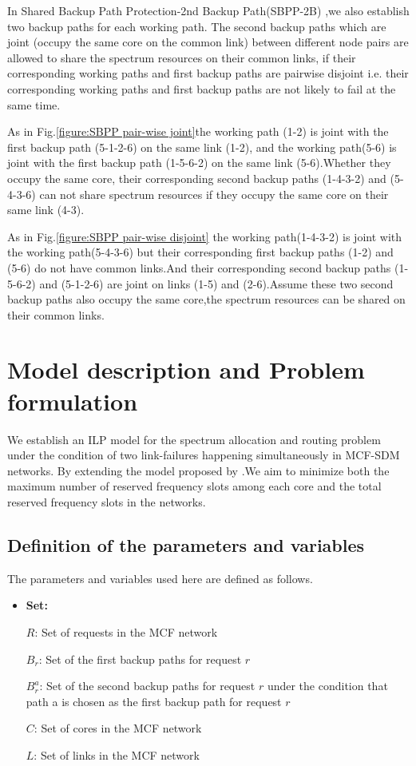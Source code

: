 \documentclass[a4paper,11pt]{report}
\begin{document}
    In Shared Backup Path Protection-2nd Backup Path(SBPP-2B) ,we also establish two backup paths for each working path. The second backup paths which are joint (occupy the same core on the common link) between different node pairs are allowed to share the spectrum resources on their common links, if their corresponding working paths and first backup paths are pairwise disjoint i.e. their corresponding working paths and first backup paths are not likely to fail at the same time.\par
    As in Fig.\ref{figure:SBPP pair-wise joint}the working path (1-2) is joint with the first backup path (5-1-2-6) on the same link (1-2), and the working path(5-6) is joint with the first backup path (1-5-6-2) on the same link (5-6).Whether they occupy the same core, their corresponding second backup paths (1-4-3-2) and (5-4-3-6) can not share spectrum resources if they occupy the same core on their same link (4-3).\par
    As in Fig.\ref{figure:SBPP pair-wise disjoint} the working path(1-4-3-2) is joint with the working path(5-4-3-6) but their corresponding first backup paths (1-2) and (5-6) do not have common links.And their corresponding second backup paths (1-5-6-2) and (5-1-2-6) are joint on links (1-5) and (2-6).Assume these two second backup paths also occupy the same core,the spectrum resources can be shared on their common links.\par

\section{Model description and Problem formulation}        
        
We establish an ILP model for the spectrum allocation and routing problem under the condition of two link-failures happening simultaneously in MCF-SDM networks. By extending the model proposed by  \cite{Hong Guo2016}.We aim to minimize both the maximum number of reserved frequency slots among each core and the total reserved frequency slots in the networks.\par

\subsection{Definition of the parameters and variables}
The  parameters and variables used here are defined as follows.
\begin{itemize}
    \item\textbf{Set:}
        \item[$R$:]Set of requests in the MCF network
        \item[$B^{}_r$:]Set of the first backup paths for request $r$
        \item[$B^{a}_r$:]Set of the second backup paths for request $r$ under the condition that path a is chosen as the first backup path for request $r$
        \item[$C$:]Set of cores in the MCF network
        \item[$L$:]Set of links in the MCF network
\end{itemize}
    
\end{document}
